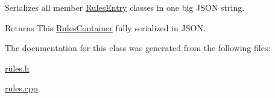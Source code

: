 Serializes all member \hyperlink{class_rules_1_1_rules_entry}{Rules\-Entry} classes in one big J\-S\-O\-N string. 

\begin{DoxyReturn}{Returns}
This \hyperlink{class_rules_1_1_rules_container}{Rules\-Container} fully serialized in J\-S\-O\-N. 
\end{DoxyReturn}


The documentation for this class was generated from the following files\-:\begin{DoxyCompactItemize}
\item 
\hyperlink{rules_8h}{rules.\-h}\item 
\hyperlink{rules_8cpp}{rules.\-cpp}\end{DoxyCompactItemize}
